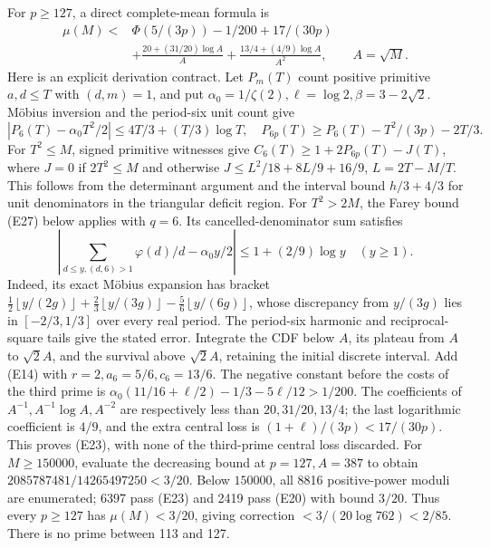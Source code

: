 \documentclass[11pt]{article}
\theoremstyle{definition}\newtheorem{definition}[theorem]{Definition}
\theoremstyle{remark}\newtheorem{remark}[theorem]{Remark}
\newcommand{\floor}[1]{\left\lfloor #1\right\rfloor}
\begin{document}
For \(p\ge127\), a direct complete-mean formula is
\[
\begin{split}
 \mu(M)<{}&\Phi(5/(3p))-1/200+17/(30p)\\
 &+\frac{20+(31/20)\log A}{A}
   +\frac{13/4+(4/9)\log A}{A^2},\qquad A=\sqrt M .
\end{split}                                                        \tag{E23}
\]
Here is an explicit derivation contract. Let \(P_m(T)\) count positive
primitive \(a,d\le T\) with \((d,m)=1\), and put
\(\alpha_0=1/\zeta(2),\ell=\log2,\beta=3-2\sqrt2\).
M\"obius inversion and the period-six unit count give
\[
 |P_6(T)-\alpha_0T^2/2|\le4T/3+(T/3)\log T,
 \quad P_{6p}(T)\ge P_6(T)-T^2/(3p)-2T/3 .                         \tag{E24}
\]
For \(T^2\le M\), signed primitive witnesses give
\(C_6(T)\ge1+2P_{6p}(T)-J(T)\), where \(J=0\) if \(2T^2\le M\)
and otherwise
\(J\le L^2/18+8L/9+16/9\), \(L=2T-M/T\).
This follows from the determinant argument and the interval bound
\(h/3+4/3\) for unit denominators in the triangular deficit region.
For \(T^2>2M\), the Farey bound (E27) below applies with \(q=6\).
Its cancelled-denominator sum satisfies
\[
 \left|\sum_{d\le y,(d,6)>1}\varphi(d)/d-\alpha_0 y/2\right|
 \le1+(2/9)\log y\quad(y\ge1).
\]
Indeed, its exact M\"obius expansion has bracket
\(\tfrac12\floor{y/(2g)}+\tfrac23\floor{y/(3g)}
-\tfrac56\floor{y/(6g)}\), whose discrepancy from \(y/(3g)\)
lies in \([-2/3,1/3]\) over every real period. The period-six
harmonic and reciprocal-square tails give the stated error.
Integrate the CDF below \(A\), its plateau from \(A\) to \(\sqrt2A\),
and the survival above \(\sqrt2A\), retaining the initial discrete
interval. Add (E14) with \(r=2,a_6=5/6,c_6=13/6\).
The negative constant before the costs of the third prime is
\(\alpha_0(11/16+\ell/2)-1/3-5\ell/12>1/200\).
The coefficients of \(A^{-1},A^{-1}\log A,A^{-2}\) are respectively
less than \(20,31/20,13/4\); the last logarithmic coefficient is
\(4/9\), and the extra central loss is
\((1+\ell)/(3p)<17/(30p)\). This proves (E23), with none of the
third-prime central loss discarded.
For \(M\ge150000\), evaluate the decreasing bound at \(p=127,A=387\)
to obtain \(2085787481/14265497250<3/20\).
Below \(150000\), all 8816 positive-power moduli are enumerated;
6397 pass (E23) and 2419 pass (E20) with bound \(3/20\).
Thus every \(p\ge127\) has \(\mu(M)<3/20\), giving correction
\(<3/(20\log762)<2/85\). There is no prime between 113 and 127.
\end{document}
